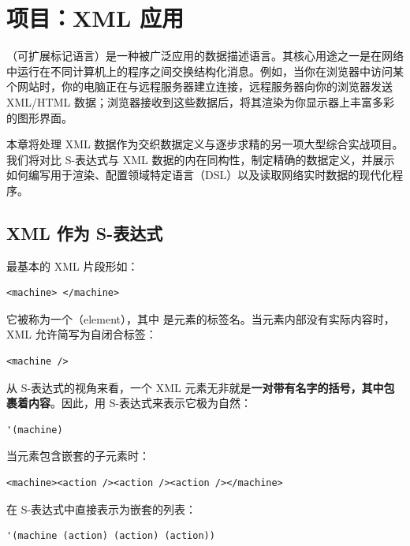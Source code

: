 
\chapter{项目：XML 应用}
\label{sec:ch22_xml}

（可扩展标记语言）是一种被广泛应用的数据描述语言。其核心用途之一是在网络中运行在不同计算机上的程序之间交换结构化消息。例如，当你在浏览器中访问某个网站时，你的电脑正在与远程服务器建立连接，远程服务器向你的浏览器发送 XML/HTML 数据；浏览器接收到这些数据后，将其渲染为你显示器上丰富多彩的图形界面。

本章将处理 XML 数据作为交织数据定义与逐步求精的另一项大型综合实战项目。我们将对比 S-表达式与 XML 数据的内在同构性，制定精确的数据定义，并展示如何编写用于渲染、配置领域特定语言（DSL）以及读取网络实时数据的现代化程序。

\section{XML 作为 S-表达式 }
\label{sec:22.1_xml_as_sexpr}

最基本的 XML 片段形如：
\begin{lstlisting}[language=BSL]
<machine> </machine>
\end{lstlisting}
它被称为一个（element），其中  是元素的标签名。当元素内部没有实际内容时，XML 允许简写为自闭合标签：
\begin{lstlisting}[language=BSL]
<machine />
\end{lstlisting}

从 S-表达式的视角来看，一个 XML 元素无非就是\textbf{一对带有名字的括号，其中包裹着内容}。因此，用 S-表达式来表示它极为自然：
\begin{lstlisting}[language=BSL]
'(machine)
\end{lstlisting}

当元素包含嵌套的子元素时：
\begin{lstlisting}[language=BSL]
<machine><action /><action /><action /></machine>
\end{lstlisting}
在 S-表达式中直接表示为嵌套的列表：
\begin{lstlisting}[language=BSL]
'(machine (action) (action) (action))
\end{lstlisting}

